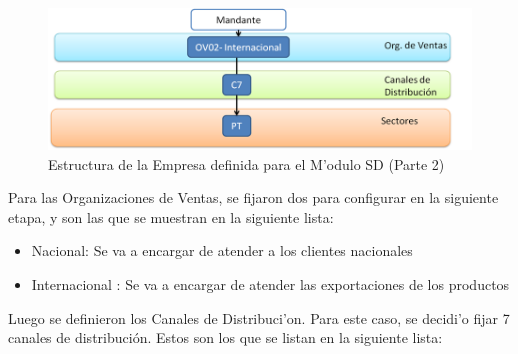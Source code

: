 \begin{figure}[htb]
\centering
\includegraphics[scale=0.45,type=png,ext=.png,read=.png]{figures/Org2}
\caption{Estructura de la Empresa definida para el M'odulo SD (Parte 2)}
\label{fig:estructura}
\end{figure}

	Para las Organizaciones de Ventas, se fijaron dos para configurar en la siguiente etapa, y son las que se muestran en la siguiente lista:

\begin{itemize}

\item Nacional: Se va a encargar de atender a los clientes nacionales
\item Internacional : Se va a encargar de atender las exportaciones de los productos
\end{itemize}
	Luego se definieron los Canales de Distribuci'on. Para este caso, se decidi'o fijar 7 canales de distribución. Estos son los que se listan en la siguiente lista:

